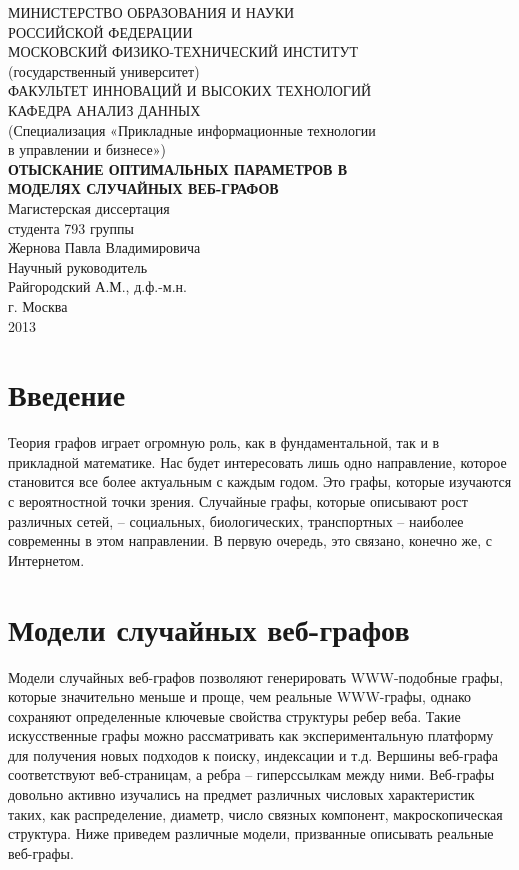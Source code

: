 \documentclass[14pt]{extreport}
\begin{document}

\begin{center}
МИНИСТЕРСТВО ОБРАЗОВАНИЯ И НАУКИ\\ РОССИЙСКОЙ ФЕДЕРАЦИИ\\[0.5cm]

МОСКОВСКИЙ ФИЗИКО-ТЕХНИЧЕСКИЙ ИНСТИТУТ\\
(государственный университет)\\[0.5cm]

ФАКУЛЬТЕТ ИННОВАЦИЙ И ВЫСОКИХ ТЕХНОЛОГИЙ\\
КАФЕДРА АНАЛИЗ ДАННЫХ\\[0.5cm]

(Специализация «Прикладные информационные технологии\\
в управлении и бизнесе»)\\[1.5cm]

{\bf ОТЫСКАНИЕ ОПТИМАЛЬНЫХ ПАРАМЕТРОВ В}\\
{\bf МОДЕЛЯХ СЛУЧАЙНЫХ ВЕБ-ГРАФОВ}\\[1.5cm]

Магистерская диссертация\\
студента 793 группы\\
Жернова Павла Владимировича\\[1.5cm]

Научный руководитель\\
Райгородский А.М., д.ф.-м.н.\\[3cm]


г. Москва\\
2013
\end{center}
\newpage
{} 
\tableofcontents
\newpage

\chapter{Введение}
Теория графов играет огромную роль, как в фундаментальной, так и в прикладной математике. Нас будет интересовать лишь одно направление, которое становится все более актуальным с каждым годом. Это графы, которые изучаются с вероятностной точки зрения. Случайные графы, которые описывают рост различных сетей, – социальных, биологических, транспортных – наиболее современны в этом направлении. В первую очередь, это связано, конечно же, с Интернетом.

\chapter{Модели случайных веб-графов}
Модели случайных веб-графов позволяют генерировать WWW-подобные графы, которые значительно меньше и проще, чем реальные WWW-графы, однако сохраняют определенные ключевые свойства структуры ребер веба. Такие искусственные графы можно рассматривать как экспериментальную платформу для получения новых подходов к поиску, индексации и т.д.
Вершины веб-графа соответствуют веб-страницам, а ребра – гиперссылкам между ними. Веб-графы довольно активно изучались на предмет различных числовых характеристик таких, как распределение, диаметр, число связных компонент, макроскопическая структура. Ниже приведем различные модели, призванные описывать реальные веб-графы.
\end{document}
